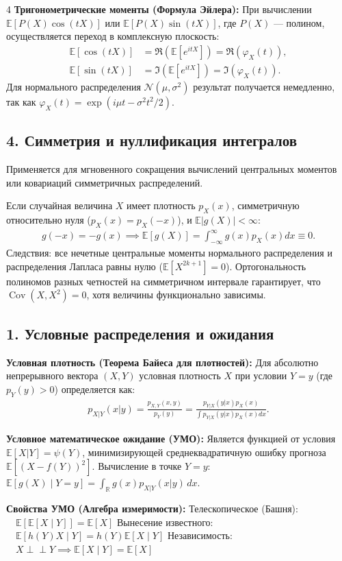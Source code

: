 \documentclass[a4paper, landscape]{article}
\newcommand{\E}{\mathbb{E}}
\newcommand{\N}{\mathcal{N}}
\DeclareMathOperator{\Cov}{Cov}
\begin{document}
\begin{multicols*}{4}
\textbf{Тригонометрические моменты (Формула Эйлера):}
При вычислении $\E[P(X)\cos(tX)]$ или $\E[P(X)\sin(tX)]$, где $P(X)$ — полином, осуществляется переход в комплексную плоскость:
\begin{align*}
    \E[\cos(tX)] &= \Re\left(\E[e^{itX}]\right) = \Re(\varphi_X(t)), \\
    \E[\sin(tX)] &= \Im\left(\E[e^{itX}]\right) = \Im(\varphi_X(t)).
\end{align*}
Для нормального распределения $\N(\mu, \sigma^2)$ результат получается немедленно, так как $\varphi_X(t) = \exp(i\mu t - \sigma^2 t^2 / 2)$.

\subsection*{4. Симметрия и нуллификация интегралов}
Применяется для мгновенного сокращения вычислений центральных моментов или ковариаций симметричных распределений.

Если случайная величина $X$ имеет плотность $p_X(x)$, симметричную относительно нуля ($p_X(x) = p_X(-x)$), и $\E|g(X)| < \infty$:
\begin{gather*}
    g(-x) = -g(x) \implies \E[g(X)] = \int_{-\infty}^\infty g(x)p_X(x)dx \equiv 0.
\end{gather*}
Следствия: все нечетные центральные моменты нормального распределения и распределения Лапласа равны нулю ($\E[X^{2k+1}] = 0$). Ортогональность полиномов разных четностей на симметричном интервале гарантирует, что $\Cov(X, X^2) = 0$, хотя величины функционально зависимы.
\subsection*{1. Условные распределения и ожидания}
\textbf{Условная плотность (Теорема Байеса для плотностей):}
Для абсолютно непрерывного вектора $(X, Y)$ условная плотность $X$ при условии $Y=y$ (где $p_Y(y) > 0$) определяется как:
\begin{gather*}
    p_{X|Y}(x|y) = \frac{p_{X,Y}(x, y)}{p_Y(y)} = \frac{p_{Y|X}(y|x) p_X(x)}{\int p_{Y|X}(y|x) p_X(x) dx}.
\end{gather*}

\textbf{Условное математическое ожидание (УМО):}
Является функцией от условия $\E[X|Y] = \psi(Y)$, минимизирующей среднеквадратичную ошибку прогноза $\E[(X - f(Y))^2]$. Вычисление в точке $Y=y$:
$
    \E[g(X) \mid Y=y] = \int_{\mathbb{R}} g(x) p_{X|Y}(x|y) \, dx.
    $

\textbf{Свойства УМО (Алгебра измеримости):}
    {Телескопическое (Башня):} $\quad \E[\E[X \mid Y]] = \E[X]$
    {Вынесение известного:} $\quad \E[h(Y) X \mid Y] = h(Y) \E[X \mid Y]$
    {Независимость:} $\quad X \perp\!\!\perp Y \implies \E[X \mid Y] = \E[X]$


\end{multicols*}
\end{document}
